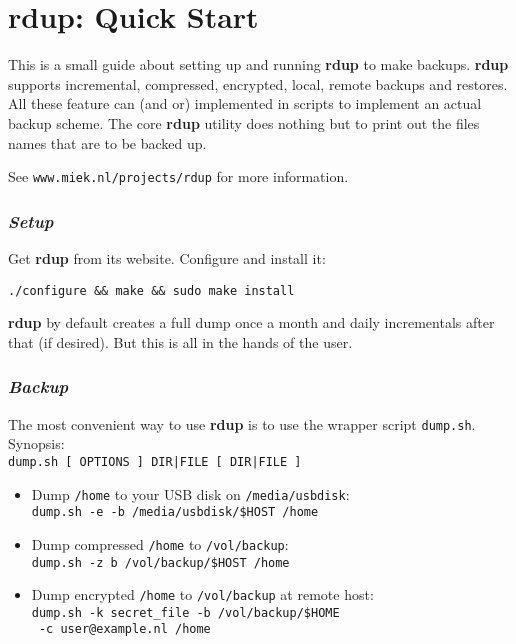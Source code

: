 \documentclass[a4paper, openany]{blocksbook}
\newcommand{\rdup}{\textbf{rdup}}
\newcommand{\cmd}[1]{\texttt{#1}}
\newcommand{\url}[1]{\texttt{#1}}
\newcommand{\path}[1]{\texttt{#1}}
\begin{document}
\chapter*{\rdup: Quick Start}
This is a small guide about setting up and running \rdup{} to make
backups. \rdup{}
supports incremental, compressed, encrypted, local, remote  backups and
restores. All these feature can (and or) implemented in scripts to
implement an actual backup scheme. The core \rdup{} utility does
nothing but to print out the files names that are to be backed up.

See \url{www.miek.nl/projects/rdup} for more information.

\subsection*{\textit{Setup}}
Get \rdup{} from its website. Configure and install it:
\begin{verbatim}
./configure && make && sudo make install
\end{verbatim}
\rdup{} by default creates a full dump once a month and 
daily incrementals after that (if desired). But this is
all in the hands of the user.

\subsection*{\textit{Backup}}
The most convenient way to use \rdup{} is to use the wrapper
script \cmd{dump.sh}. Synopsis:\\
\cmd{dump.sh [ OPTIONS ] DIR|FILE [ DIR|FILE ]}
\begin{itemize}
\item
Dump \path{/home} to your USB disk on \path{/media/usbdisk}:\\
\cmd{dump.sh -e -b /media/usbdisk/\$HOST /home}
\item
Dump compressed \path{/home} to \path{/vol/backup}:\\
\cmd{dump.sh -z b /vol/backup/\$HOST /home} 
\item
Dump encrypted \path{/home} to \path{/vol/backup} at remote
host:\\
\cmd{dump.sh -k secret\_file -b /vol/backup/\$HOME \\\
-c user@example.nl /home}
\end{itemize}
\end{document}
